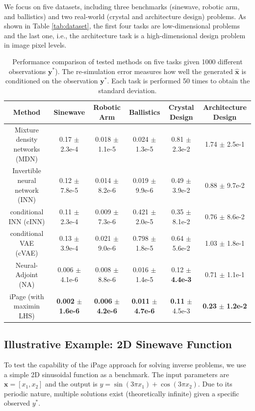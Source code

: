 \documentclass[letterpaper]{article}
\begin{document}
 We focus on five datasets, including three benchmarks (sinewave, robotic arm, and ballistics) and two real-world (crystal and architecture design) problems. As shown in Table \ref{tab:dataset}, the first four tasks are low-dimensional problems and the last one, i.e., the architecture task is a high-dimensional design problem in image pixel levels.

\begin{table}[!htbp]
\footnotesize
\centering
\caption{Performance comparison of tested methods on five tasks given 1000 different observations $\mathbf{y}^*$). The re-simulation error measures how well the generated $\hat{\mathbf{x}}$ is conditioned on the observation $\mathbf{y}^*$. Each task is performed 50 times to obtain the standard deviation.}
\label{tab:1000_y}
\begin{adjustbox}{width=0.22\columnwidth}
\begin{tabular}{@{}cccccc@{}}
\toprule
Method & Sinewave     & Robotic Arm     & Ballistics     & Crystal Design   & Architecture Design                          \\ \midrule
Mixture density networks (MDN)    & 0.17 $\pm$ 2.3e-4  & 0.018  $\pm$  1.1e-5  & 0.024 $\pm$ 1.3e-5 & 0.81 $\pm$   2.3e-2  & 1.74 $\pm$ 2.5e-1   \\
Invertible neural network (INN)    & 0.12 $\pm$ 7.8e-5  & 0.014  $\pm$  8.2e-6  & 0.019 $\pm$ 9.9e-6 & 0.49 $\pm$ 3.9e-2   & 0.88 $\pm$ 9.7e-2 \\
conditional INN (cINN)   & 0.11 $\pm$ 2.3e-4  & 0.009 $\pm$ 7.3e-6    & 0.421 $\pm$ 2.0e-5   & 0.35 $\pm$ 8.1e-2  & 0.76 $\pm$ 8.6e-2    \\
conditional VAE (cVAE)   & 0.13 $\pm$ 3.9e-4  & 0.021 $\pm$  9.0e-6   & 0.798 $\pm$ 1.8e-5   & 0.64 $\pm$ 5.6e-2  & 1.03 $\pm$ 1.8e-1   \\
Neural-Adjoint (NA)     & 0.006 $\pm$ 4.1e-6 & 0.008  $\pm$  8.8e-6  & 0.016 $\pm$ 1.4e-5   & 0.12 $\pm$  {\bf 4.4e-3}  & 0.71 $\pm$ 1.1e-1 \\ \midrule
iPage (with maximin LHS)  & {\bf 0.002} $\pm$ {\bf 1.6e-6} & {\bf 0.006}  $\pm$  {\bf 4.2e-6}  & {\bf 0.011} $\pm$ {\bf 4.7e-6}   & {\bf 0.11} $\pm$ 4.5e-3  & {\bf 0.23} $\pm$ {\bf 1.2e-2} \\ \bottomrule
\end{tabular}
\end{adjustbox}
\end{table}
\subsection{Illustrative Example: 2D Sinewave Function}
To test the capability of the iPage approach for solving inverse problems, we use a simple 2D sinusoidal function as a benchmark. The input parameters are $\mathbf{x} = [x_1, x_2]$ and the output is $y = \sin(3\pi x_1) + \cos(3\pi x_2)$. Due to its periodic nature, multiple solutions exist (theoretically infinite) given a specific observed $y^*$.
\end{document}
